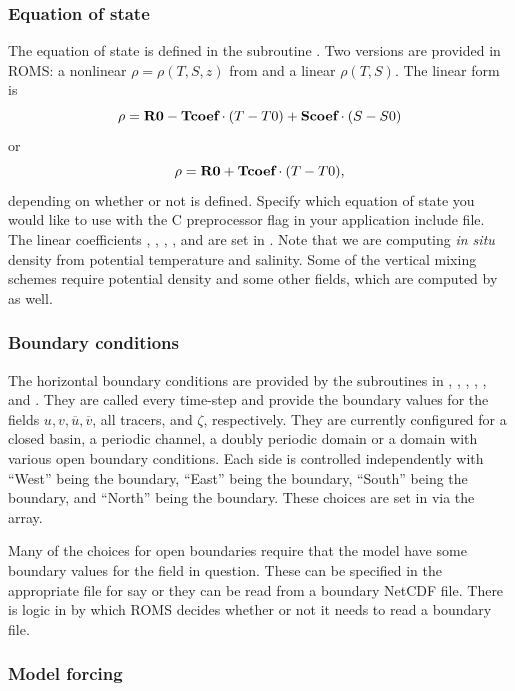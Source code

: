 \subsubsection{Equation of state}
The equation of state is defined in the subroutine .  Two
versions are provided in ROMS: a nonlinear $\rho =
\rho(T,S,z)$ from \cite{Jackett} and a linear
$\rho(T,S)$.  The linear form is
$$
      \rho = \mbox{\bf R0} - \mbox{\bf Tcoef} \cdot (T-T0) +
      \mbox{\bf Scoef} \cdot (S-S0)
$$
or
$$
     \rho = \mbox{\bf R0} + \mbox{\bf Tcoef} \cdot (T-T0),
$$
depending on whether or not
 is defined.  Specify which equation of state you
would like to use with the  C preprocessor flag in your
application include file. The linear coefficients , ,
, , and  are set in . Note
that we are computing {\em in situ} density from potential temperature and
salinity. Some of the vertical mixing schemes require potential density
and some other fields, which are computed by  as well.

\subsubsection{Boundary conditions}
\label{Bcs}
The horizontal boundary conditions are provided by the subroutines
in , , , ,
, and .  They are called every time-step
and provide the boundary values for the fields $u, v, \overline{u},
\overline{v}$, all tracers, and $\zeta$, respectively. They are currently
configured for a closed basin, a periodic channel, a doubly periodic
domain or a domain with various open boundary conditions. Each side is
controlled independently with ``West'' being the  boundary,
``East'' being the  boundary, ``South'' being the 
boundary, and ``North'' being the  boundary. These choices are
set in  via the  array.

Many of the choices for open boundaries require that the model have
some boundary values for the field in question. These can be specified in
the appropriate  file for say  or
they can be read from a boundary NetCDF file. There is logic in
 by which ROMS decides whether or not it needs to
read a boundary file.

\subsubsection{Model forcing}
\label{Mforce}

